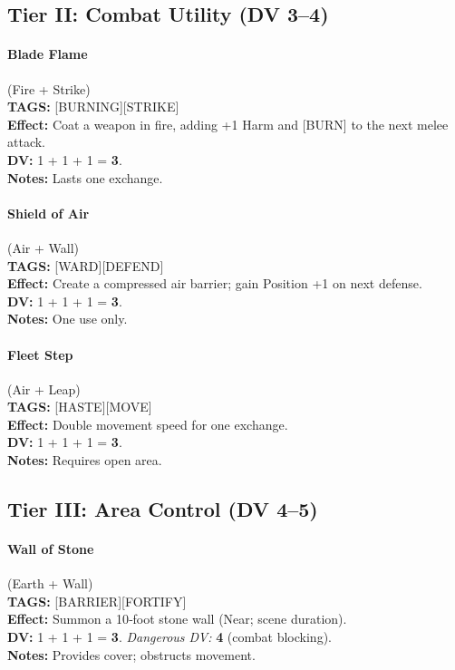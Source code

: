 \subsection{Tier II: Combat Utility (DV 3--4)}

\paragraph{Blade Flame} (Fire + Strike) \\
\textbf{TAGS:} {[BURNING][STRIKE]} \\
\textbf{Effect:} Coat a weapon in fire, adding +1 Harm and {[BURN]} to the next melee attack. \\
\textbf{DV:} 1 + 1 + 1 = \textbf{3}. \\
\textbf{Notes:} Lasts one exchange.

\paragraph{Shield of Air} (Air + Wall) \\
\textbf{TAGS:} {[WARD][DEFEND]} \\
\textbf{Effect:} Create a compressed air barrier; gain Position +1 on next defense. \\
\textbf{DV:} 1 + 1 + 1 = \textbf{3}. \\
\textbf{Notes:} One use only.

\paragraph{Fleet Step} (Air + Leap) \\
\textbf{TAGS:} {[HASTE][MOVE]} \\
\textbf{Effect:} Double movement speed for one exchange. \\
\textbf{DV:} 1 + 1 + 1 = \textbf{3}. \\
\textbf{Notes:} Requires open area.

\subsection{Tier III: Area Control (DV 4--5)}

\paragraph{Wall of Stone} (Earth + Wall) \\
\textbf{TAGS:} {[BARRIER][FORTIFY]} \\
\textbf{Effect:} Summon a 10‑foot stone wall (Near; scene duration). \\
\textbf{DV:} 1 + 1 + 1 = \textbf{3}. \emph{Dangerous DV:} \textbf{4} (combat blocking). \\
\textbf{Notes:} Provides cover; obstructs movement.

